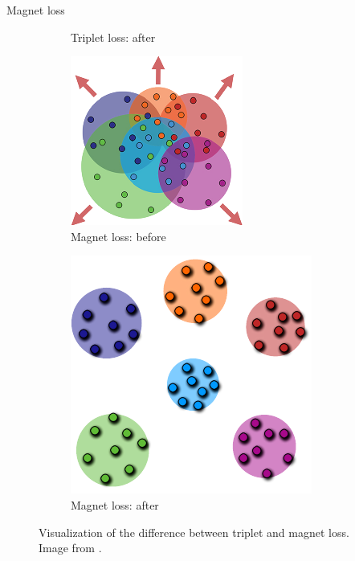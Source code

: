 \documentclass[10pt]{beamer}
\begin{document}
\begin{frame}{Magnet loss}
\begin{figure}[h]
\begin{subfigure}[b]{0.18\textwidth}
			\caption{Triplet loss: after}
		\end{subfigure}
		\hfill
		\begin{subfigure}[b]{0.18\textwidth}
			\centering
			\includegraphics[width=\textwidth]{images/triplet-magnet-difference/magnet_before.pdf}
			\caption{Magnet loss: before}
		\end{subfigure}
		\hfill
		\begin{subfigure}[b]{0.18\textwidth}
			\centering
			\includegraphics[width=\textwidth]{images/triplet-magnet-difference/magnet_after.pdf}
			\caption{Magnet loss: after}
		\end{subfigure}
		\caption{Visualization of the difference between triplet and magnet loss. Image from \cite{rippel_metric_2016}.}
	\end{figure}
\end{frame}
\end{document}
